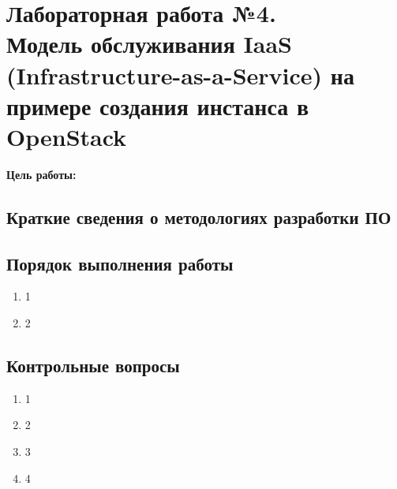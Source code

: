 \section[ЛР №4. Модель обслуживания IaaS, OpenStack]{Лабораторная работа №4. \\
Модель обслуживания IaaS (Infrastructure-as-a-Service) на примере создания инстанса в OpenStack}

\textbf{Цель работы:}

\subsection{Краткие сведения о методологиях разработки ПО}


\subsection{Порядок выполнения работы}

\begin{enumerate}
    \item 1
    \item 2
\end{enumerate}

\subsection{Контрольные вопросы}
\begin{enumerate}
    \item 1
    \item 2
    \item 3
    \item 4
\end{enumerate}

\clearpage
